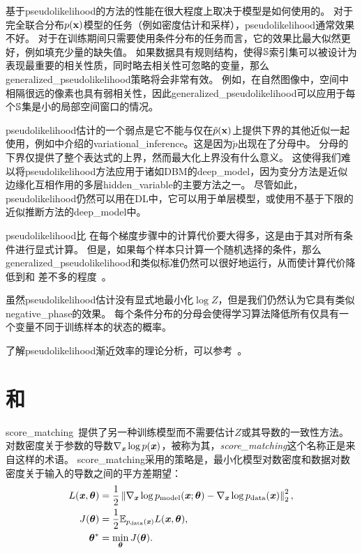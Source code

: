 基于\gls{pseudolikelihood}的方法的性能在很大程度上取决于模型是如何使用的。
对于完全联合分布$p(\mathbf{x})$模型的任务（例如密度估计和采样），\gls{pseudolikelihood}通常效果不好。
对于在训练期间只需要使用条件分布的任务而言，它的效果比最大似然更好，例如填充少量的缺失值。
如果数据具有规则结构，使得$\mathbb{S}$索引集可以被设计为表现最重要的相关性质，同时略去相关性可忽略的变量，那么\gls{generalized_pseudolikelihood}策略将会非常有效。
例如，在自然图像中，空间中相隔很远的像素也具有弱相关性，因此\gls{generalized_pseudolikelihood}可以应用于每个$\mathbb{S}$集是小的局部空间窗口的情况。

\gls{pseudolikelihood}估计的一个弱点是它不能与仅在$\tilde{p}(\mathbf{x})$上提供下界的其他近似一起使用，例如中介绍的\gls{variational_inference}。这是因为$\tilde{p}$出现在了分母中。
分母的下界仅提供了整个表达式的上界，然而最大化上界没有什么意义。
这使得我们难以将\gls{pseudolikelihood}方法应用于诸如\gls{DBM}的\gls{deep_model}，因为变分方法是近似边缘化互相作用的多层\gls{hidden_variable}的主要方法之一。
尽管如此，\gls{pseudolikelihood}仍然可以用在\gls{DL}中，它可以用于单层模型，或使用不基于下限的近似推断方法的\gls{deep_model}中。


\gls{pseudolikelihood}比\,\,在每个梯度步骤中的计算代价要大得多，这是由于其对所有条件进行显式计算。
但是，如果每个样本只计算一个随机选择的条件，那么\gls{generalized_pseudolikelihood}和类似标准仍然可以很好地运行，从而使计算代价降低到和\,\,差不多的程度~\citep{Goodfellow-et-al-NIPS2013}。


虽然\gls{pseudolikelihood}估计没有显式地最小化$\log Z$，但是我们仍然认为它具有类似\gls{negative_phase}的效果。
每个条件分布的分母会使得学习算法降低所有仅具有一个变量不同于训练样本的状态的概率。


了解\gls{pseudolikelihood}渐近效率的理论分析，可以参考~\cite{Marlin11-small}。

\section{和}
\label{sec:score_matching_and_ratio_matching}
\gls{score_matching}~\citep{Hyvarinen-2005-small}提供了另一种训练模型而不需要估计$Z$或其导数的一致性方法。
对数密度关于参数的导数$\nabla_{\boldsymbol{\mathit{x}}} \log p(\boldsymbol{\mathit{x}})$，被称为其，\emph{\gls{score_matching}}这个名称正是来自这样的术语。
\gls{score_matching}采用的策略是，最小化模型对数密度和数据对数密度关于输入的导数之间的平方差期望：
\begin{align}
	L(\boldsymbol{\mathit{x}}, \boldsymbol{\theta}) & = \frac{1}{2} \left\lVert  \nabla_{\boldsymbol{\mathit{x}}} \log p_{\text{model}}(\boldsymbol{\mathit{x}}; \boldsymbol{\theta}) - \nabla_{\boldsymbol{\mathit{x}}} \log p_{\text{data}} (\boldsymbol{\mathit{x}})  \right\rVert_2^2, \\
	J(\boldsymbol{\theta}) & = \frac{1}{2} \mathbb{E}_{p_{\text{data}}(\boldsymbol{\mathit{x}})}  L(\boldsymbol{\mathit{x}}, \boldsymbol{\theta}), \\
	\boldsymbol{\theta}^* & = \min_{\boldsymbol{\theta}} J(\boldsymbol{\theta}) . \\
\end{align}


